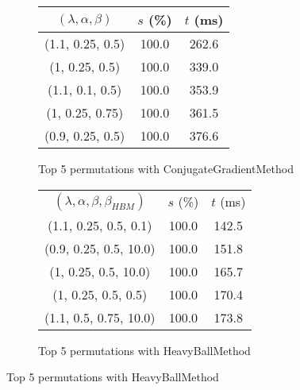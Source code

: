 \begin{figure}[H]
\begin{subfigure}[ht]{.5\textwidth}
\begin{tabular}{|c|c|c|}
\hline
\rowcolor{gray!25}
$(\lambda,\alpha,\beta)$ & $s$ (\%) & $t$ (ms) \\
\hline
(1.1, 0.25, 0.5) & 100.0 & 262.6 \\
(1, 0.25, 0.5) & 100.0 & 339.0 \\
(1.1, 0.1, 0.5) & 100.0 & 353.9 \\
(1, 0.25, 0.75) & 100.0 & 361.5 \\
(0.9, 0.25, 0.5) & 100.0 & 376.6 \\
\hline
\end{tabular}
\caption{Top 5 permutations with ConjugateGradientMethod}
\label{subfig:param_comp_MatrixSquareSum_ConjugateGradientMethod_ArmijoSearch}
\end{subfigure}
\hfill
\begin{subfigure}[ht]{.5\textwidth}
\begin{tabular}{|c|c|c|}
\hline
\rowcolor{gray!25}
\multicolumn{3}{|c|}{HeavyBallMethod} \\
\hline
\rowcolor{gray!25}
$(\lambda,\alpha,\beta,\beta_{HBM})$ & $s$ (\%) & $t$ (ms) \\
\hline
(1.1, 0.25, 0.5, 0.1) & 100.0 & 142.5 \\
(0.9, 0.25, 0.5, 10.0) & 100.0 & 151.8 \\
(1, 0.25, 0.5, 10.0) & 100.0 & 165.7 \\
(1, 0.25, 0.5, 0.5) & 100.0 & 170.4 \\
(1.1, 0.5, 0.75, 10.0) & 100.0 & 173.8 \\
\hline
\end{tabular}
\caption{Top 5 permutations with HeavyBallMethod}
\label{subfig:param_comp_MatrixSquareSum_HeavyBallMethod_ArmijoSearch}
\end{subfigure}
\end{figure}

